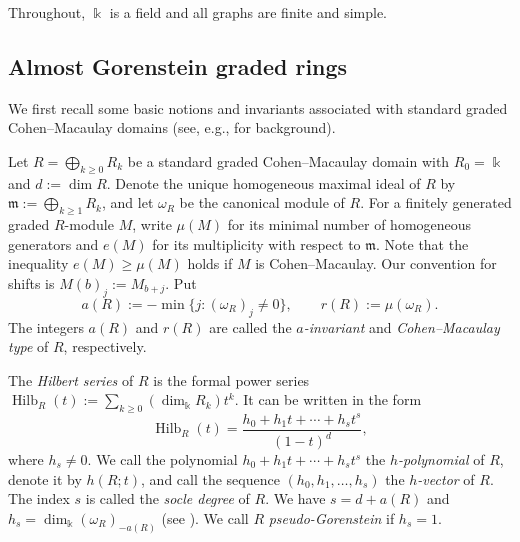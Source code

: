 \documentclass[a4paper,reqno,11pt]{amsart}
\theoremstyle{definition}
\theoremstyle{remark}
\numberwithin{equation}{section}
\newcommand{\kk}{\Bbbk}
\newcommand{\frakm}{\mathfrak m}
\newcommand{\Hilb}{\operatorname{Hilb}}
\newcommand{\type}{r}
\begin{document}
Throughout, $\kk$ is a field and all graphs are finite and simple.

\subsection{Almost Gorenstein graded rings}\label{subsec:almost-gorenstein}
We first recall some basic notions and invariants associated with standard graded Cohen--Macaulay domains (see, e.g., \cite{bruns1998cohen} for background).

Let $R=\bigoplus _{k\ge 0}R_k$ be a standard graded Cohen--Macaulay domain with $R_0=\kk$ and $d:=\dim R$.
Denote the unique homogeneous maximal ideal of $R$ by $\frakm:=\bigoplus_{k\ge 1} R_k$, and let $\omega_R$ be the canonical module of $R$.
For a finitely generated graded $R$-module $M$, write $\mu(M)$ for its minimal number of homogeneous generators and $e(M)$ for its multiplicity with respect to $\frakm$.
Note that the inequality $e(M)\ge \mu (M)$ holds if $M$ is Cohen--Macaulay.
Our convention for shifts is $M(b)_j:=M_{b+j}$.
Put
\[
    a(R):=-\min\{j:(\omega_R)_j\ne0\},\qquad
    \type(R):=\mu(\omega_R).
\]
The integers $a(R)$ and $\type(R)$ are called the \textit{$a$-invariant} and \textit{Cohen--Macaulay type} of $R$, respectively.

The \textit{Hilbert series} of $R$ is the formal power series $\Hilb_R(t):=\sum_{k\ge 0}(\dim_\kk R_k)t^k$.
It can be written in the form
\[
    \Hilb_R(t)=\frac{h_0+h_1t+\cdots+h_st^s}{(1-t)^d},
\]
where $h_s \neq 0$.
We call the polynomial $h_0+h_1t+\cdots+h_st^s$ the \textit{$h$-polynomial} of $R$, denote it by $h(R;t)$, and call the sequence $(h_0,h_1,\ldots,h_s)$ the \textit{$h$-vector} of $R$.
The index $s$ is called the \textit{socle degree} of $R$.
We have $s=d+a(R)$ and $h_s=\dim_\kk (\omega_R)_{-a(R)}$ (see \cite[Section 4.4]{bruns1998cohen}).
We call $R$ \textit{pseudo-Gorenstein} if $h_s=1$.
\end{document}
